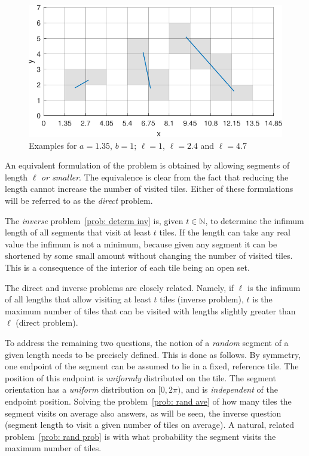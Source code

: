\documentclass[12pt, a4paper]{article}
\newcommand{\len}{\ell} %
\newcommand{\tiles}{t} %
\begin{document}
\begin{figure}
\centering%
\includegraphics[width=.85\textwidth]{examples_1p35}%
\caption{Examples for $a=1.35$, $b=1$; $\len=1$, $\len=2.4$ and $\len=4.7$
}%
\label{fig: examples}%
\end{figure}%

An equivalent formulation of the problem is obtained by allowing segments of length $\len$ \emph{or smaller}. The equivalence is clear from the fact that reducing the length cannot increase the number of visited tiles. Either of these formulations will be referred to as the \emph{direct} problem.

The \emph{inverse} problem~\ref{prob: determ inv} is, given $\tiles \in \mathbb N$, to determine the infimum length of all segments that visit at least $\tiles$ tiles. If the length can take any real value the infimum is not a minimum, because given any segment it can be shortened by some small amount without changing the number of visited tiles. This is a consequence of the interior of each tile being an open set.

The direct and inverse problems are closely related. Namely, if $\len$ is the infimum of all lengths that allow visiting at least $\tiles$ tiles (inverse problem), $\tiles$ is the maximum number of tiles that can be visited with lengths slightly greater than $\len$ (direct problem).

To address the remaining two questions, the notion of a \emph{random} segment of a given length needs to be precisely defined. This is done as follows. By symmetry, one endpoint of the segment can be assumed to lie in a fixed, reference tile. The position of this endpoint is \emph{uniformly} distributed on the tile. The segment orientation has a \emph{uniform} distribution on $[0,2\pi)$, and is \emph{independent} of the endpoint position. Solving the problem~\ref{prob: rand ave} of how many tiles the segment visits on average also answers, as will be seen, the inverse question (segment length to visit a given number of tiles on average). A natural, related problem~\ref{prob: rand prob} is with what probability the segment visits the maximum number of tiles. 
\end{document}
